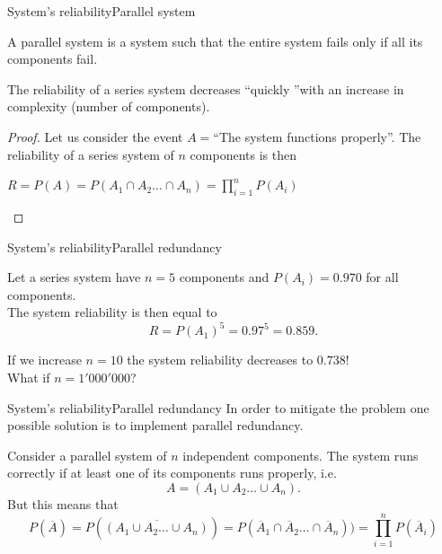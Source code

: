 \documentclass[handout]{beamer}
\begin{document}
\begin{frame}{System's reliability}{Parallel system}

\begin{Definition}
 A parallel system is a system such that the entire system fails only if all its components fail.
\end{Definition}

\begin{theorem}
The reliability of a series system decreases \textquotedblleft quickly \textquotedblright with an increase in complexity (number of 
components). 
\end{theorem}

\begin{proof}
Let us consider the event $A=$\textquotedblleft The system functions properly\textquotedblright. The 
reliability of a series system of $n$ components is then \\
\begin{center}
$ R = P(A) = P(A_1 \cap A_2 \dots \cap A_n)= \prod_{i=1}^n P(A_i)$  
\end{center}
\end{proof}
\end{frame}



\begin{frame}{System's reliability}{Parallel redundancy}
\begin{example}
Let a series system have $n=5$ components and $P(A_i)=0.970$ for all components.\\
\vspace{0.75cm}
The system reliability is then equal to 
\[ R = P(A_1)^5 = 0.97^5 = 0.859.\]

If we increase $n=10$ the system reliability decreases to $0.738$!\\
\vspace{0.75cm}
What if $n=1'000'000$?
\vspace{0.5cm}
\end{example}
\end{frame}

\begin{frame}{System's reliability}{Parallel redundancy}
In order to mitigate the problem one possible solution is to implement parallel redundancy.
\begin{example}
Consider a parallel system of $n$ independent components. The system runs correctly if at least one of its components
runs properly, i.e. 
\[
 A = (A_1 \cup A_2 \dots \cup A_n). 
\]
But this means that
\[ P(\overline A) = P(\overline{(A_1 \cup A_2 \dots \cup A_n)})=P(\overline A_1 \cap \overline A_2 \dots \cap 
\overline A_n))=\prod_{i=1}^n P(\overline A_i)\]
\end{example}
\end{frame}
\end{document}
